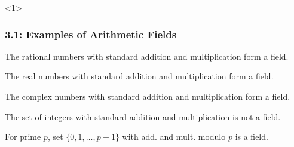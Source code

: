 \documentclass[10pt,english,aspectratio=169]{beamer}
\begin{document}
\begin{frame}<1> \frametitle{3.1: Examples of Arithmetic Fields}

\begin{example}
The rational numbers with standard addition and multiplication form a field.
\end{example}

\begin{example}
The real numbers with standard addition and multiplication form a field.
\end{example}

\begin{example}
The complex numbers with standard addition and multiplication form a field.
\end{example}

\begin{example}
The set of integers with standard addition and multiplication is not a field.
\end{example}

\begin{example}
For prime $p$, set $\{0,1,\ldots,p-1\}$ with add. and mult. modulo $p$ is a field.
\end{example}


\end{frame}
\end{document}
